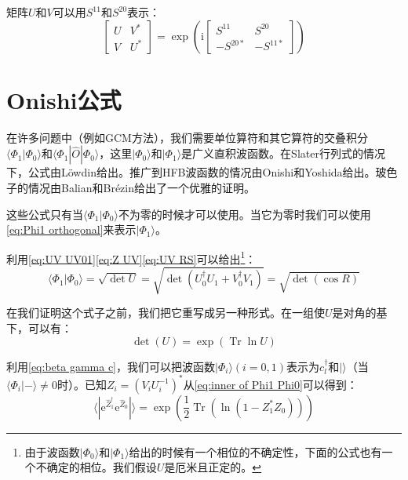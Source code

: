 矩阵$U$和$V$可以用$S^{11}$和$S^{20}$表示：
\[
\begin{bmatrix}U & V^{*}\\
V & U^{*}
\end{bmatrix}=\exp\left(\mathrm{i}\begin{bmatrix}S^{11} & S^{20}\\
-S^{20*} & -S^{11*}
\end{bmatrix}\right)
\]


\section{Onishi公式}

在许多问题中（例如GCM方法），我们需要单位算符和其它算符的交叠积分$\langle\Phi_{1}|\Phi_{0}\rangle$和$\langle\Phi_{1}|\hat{O}|\Phi_{0}\rangle$，这里$|\Phi_{0}\rangle$和$|\Phi_{1}\rangle$是广义直积波函数。在Slater行列式的情况下，公式由Löwdin\cite{Lo55}给出。推广到HFB波函数的情况由Onishi和Yoshida给出\cite{OY66}。玻色子的情况由Balian和Brézin\cite{BB69}给出了一个优雅的证明。

这些公式只有当$\langle\Phi_{1}|\Phi_{0}\rangle$不为零的时候才可以使用。当它为零时我们可以使用\ref{eq:Phi1 orthogonal}来表示$|\Phi_{1}\rangle$。

利用\ref{eq:UV UV01}\ref{eq:Z UV}\ref{eq:UV RS}可以给出\footnote{由于波函数$|\Phi_{0}\rangle$和$|\Phi_{1}\rangle$给出的时候有一个相位的不确定性，下面的公式也有一个不确定的相位。我们假设$U$是厄米且正定的。}：
\begin{equation}
\langle\Phi_{1}|\Phi_{0}\rangle=\sqrt{\det U}=\sqrt{\det(U^{\dagger}_{0}U_{1}+V^{\dagger}_{0}V_{1})}=\sqrt{\det(\cos R)}\label{eq:inner of Phi1 Phi0}
\end{equation}

在我们证明这个式子之前，我们把它重写成另一种形式。在一组使$U$是对角的基下，可以有：
\[
\det(U)=\exp(\mathop{\text{Tr}}\ln U)
\]

利用\ref{eq:beta gamma c}，我们可以把波函数$|\Phi_{i}\rangle(i=0,1)$表示为$c^{\dagger}_{l}$和$|\rangle$（当$\langle\Phi_{i}|-\rangle\neq0$时）。已知$Z_{i}=(V_{i}U^{-1}_{i})^{*}$从\ref{eq:inner of Phi1 Phi0}可以得到：
\[
\langle|\mathrm{e}^{\hat{Z}^{\dagger}_{1}}\mathrm{e}^{\hat{Z}_{0}}|\rangle=\exp\left(\frac{1}{2}\mathop{\text{Tr}}\left(\ln(1-Z^{*}_{1}Z_{0})\right)\right)
\]

